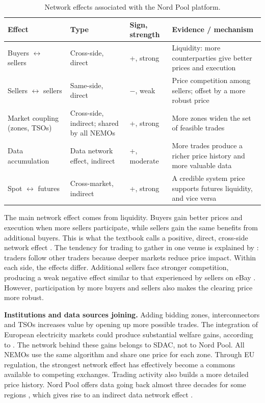 \begin{table}[ht]
\centering
\small
\caption{Network effects associated with the Nord Pool platform.}
\label{tab:ne}
\begin{tabularx}{\textwidth}{L{3.2cm} L{3.4cm} L{2.0cm} Y}
\toprule
\textbf{Effect} & \textbf{Type} & \textbf{Sign, strength} & \textbf{Evidence / mechanism} \\
\midrule
Buyers $\leftrightarrow$ sellers & Cross-side, direct & +, strong & Liquidity: more counterparties give better prices and execution \citep{Pagano1989} \\
Sellers $\leftrightarrow$ sellers & Same-side, direct & $-$, weak & Price competition among sellers; offset by a more robust price \\
Market coupling (zones, TSOs) & Cross-side, indirect; shared by all NEMOs & +, strong & More zones widen the set of feasible trades \citep{Newbery2016} \\
Data accumulation & Data network effect, indirect & +, moderate & More trades produce a richer price history and more valuable data \citep{NPData} \\
Spot $\leftrightarrow$ futures & Cross-market, indirect & +, strong & A credible system price supports futures liquidity, and vice versa \citep{NPPrice,Euronext2026} \\
\bottomrule
\end{tabularx}
\end{table}

The main network effect comes from liquidity. Buyers gain better prices and execution when more sellers participate, while sellers gain the same benefits from additional buyers. This is what the textbook calls a positive, direct, cross-side network effect \citep[Sections~9.4--9.5]{OverbyAudestad2021}. The tendency for trading to gather in one venue is explained by \citet{Pagano1989}: traders follow other traders because deeper markets reduce price impact. Within each side, the effects differ. Additional sellers face stronger competition, producing a weak negative effect similar to that experienced by sellers on eBay \citep[Section~10.3]{OverbyAudestad2021}. However, participation by more buyers and sellers also makes the clearing price more robust.

\textbf{Institutions and data sources joining.} Adding bidding zones, interconnectors and TSOs increases value by opening up more possible trades. The integration of European electricity markets could produce substantial welfare gains, according to \citet{Newbery2016}. The network behind these gains belongs to SDAC, not to Nord Pool. All NEMOs use the same algorithm and share one price for each zone. Through EU regulation, the strongest network effect has effectively become a commons available to competing exchanges. Trading activity also builds a more detailed price history. Nord Pool offers data going back almost three decades for some regions \citep{NPData}, which gives rise to an indirect data network effect \citep[Section~9.3]{OverbyAudestad2021}.

